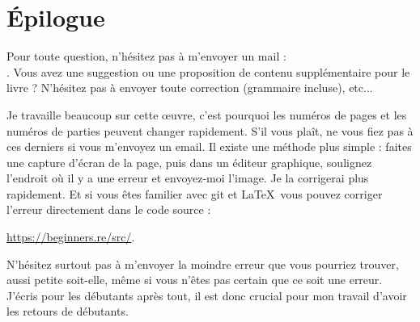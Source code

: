 ﻿\part*{Épilogue}


Pour toute question, n'hésitez pas à m'envoyer un mail : \\
\GTT{\EMAILS}.
Vous avez une suggestion ou une proposition de contenu supplémentaire pour le livre ?
N'hésitez pas à envoyer toute correction (grammaire incluse), etc...

Je travaille beaucoup sur cette \oe{}uvre, c'est pourquoi les numéros de pages
et les numéros de parties peuvent changer rapidement.
S'il vous plaît, ne vous fiez pas à ces derniers si vous m'envoyez un email. 
Il existe une méthode plus simple : faites une capture d'écran de la page, puis dans
un éditeur graphique, soulignez l'endroit où il y a une erreur et envoyez-moi l'image.
Je la corrigerai plus rapidement.
Et si vous êtes familier avec git et \LaTeX\, vous pouvez corriger l'erreur directement
dans le code source :

\url{https://beginners.re/src/}.

N'hésitez surtout pas à m'envoyer la moindre erreur que vous pourriez trouver, aussi
petite soit-elle, même si vous n'êtes pas certain que ce soit une erreur.
J'écris pour les débutants après tout, il est donc crucial pour mon travail d'avoir
les retours de débutants.

